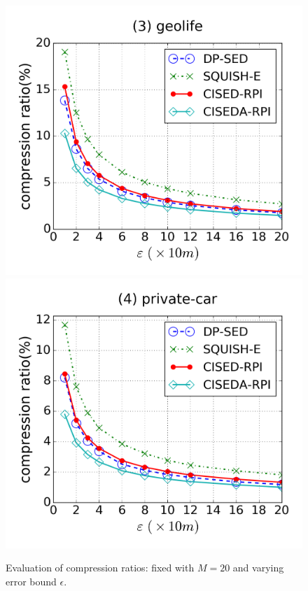 \begin{figure}[tb!]
\includegraphics[scale = 0.250]{figures/Exp-cr-epsilon-geolife.png}
\includegraphics[scale = 0.250]{figures/Exp-cr-epsilon-private.png}
\vspace{-3ex}
\caption{\small Evaluation of compression ratios: fixed with $M=20$ and varying error bound $\epsilon$.}
\label{fig:cr-m20}
\vspace{-1.0ex}
\end{figure}


